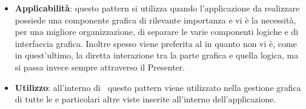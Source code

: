 \begin{itemize}
	\item \textbf{Applicabilità}: questo pattern si utilizza quando l'applicazione da realizzare possiede una componente grafica di rilevante importanza e vi è la necessità, per una migliore organizzazione, di separare le varie componenti logiche e di interfaccia grafica. Inoltre spesso viene preferita al  in quanto non vi è, come in quest'ultimo, la diretta interazione tra la parte grafica e quella logica, ma si passa invece sempre attraverso il Presenter.
	\item \textbf{Utilizzo}: all'interno di \progettoShort\ questo pattern viene utilizzato nella gestione grafica di tutte le  e particolari altre viste inserite all'interno dell'applicazione.
\end{itemize}

